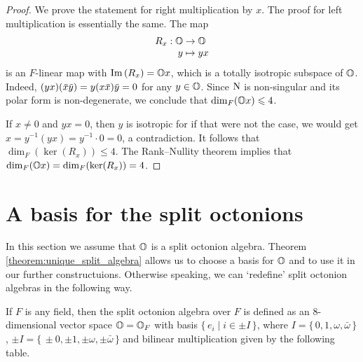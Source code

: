 \begin{proof}
	We prove the statement for right multiplication by $x$. The proof
	for left multiplication is essentially the same. The map
	\begin{equation*}
		\begin{array}{r@{\;}c@{\;}l}
			R_x : \O & \rightarrow & \O \\
			y & \mapsto & yx
		\end{array}
	\end{equation*}
	is an $F$-linear map with $\mathrm{Im}\,(R_x) = \mathbb{O} x$, which is a totally isotropic
	subspace of $\mathbb{O}$. Indeed, $(yx)(\ovx \ovy) = y(x\ovx)\ovy = 0$ for any
	$y \in \mathbb{O}$. Since $\mathord{\mathrm{N}}$ is non-singular and its polar form is non-degenerate,
	we conclude that $\dim_F(\mathbb{O} x) \leqslant 4$.
	
	If $x \neq 0$ and $yx = 0$, then $y$ is isotropic for if that were not 
	the case, we would get $x = y^{-1}(yx) = y^{-1}\cdot 0 = 0$,
	a contradiction. It follows that \mbox{$\dim_F(\ker(R_x)) \leqslant 4$}.
	The Rank--Nullity theorem implies that \mbox{$\dim_F(\mathbb{O} x) = \dim_F(\operatorname{ker}(R_x)) = 4$}. 
\end{proof}

\section{A basis for the split octonions}
\label{section:split_basis}

In this section we assume that $\mathbb{O}$ is a split octonion algebra. 
Theorem \ref{theorem:unique_split_algebra} 
allows us to choose a basis for $\mathbb{O}$ and to use it in our further constructuions.
Otherwise speaking, we can `redefine' split octonion algebras in the following way. 

\begin{definition}
	\label{def:split_octonions}
	If $F$ is any field, then the split octonion algebra over $F$ is defined as an
	$8$-dimensional vector space $\mathbb{O} = \mathbb{O}_F$ with basis $\{\,e_i \mid i \in \pm I\,\}$,
	where $I = \{\,0,1,\omega,\bar{\omega}\,\}$, $\pm I = \{\,\pm 0, \pm 1, \pm \omega,
	\pm \bar{\omega}\,\}$ and bilinear multiplication given by the following table.
\end{definition}

